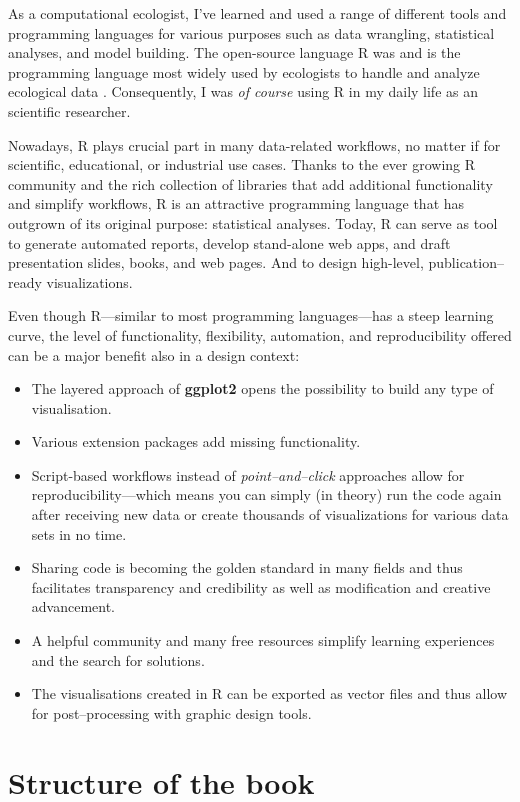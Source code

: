 \documentclass[
]{krantz}
\providecommand{\tightlist}{%
  \setlength{\itemsep}{0pt}\setlength{\parskip}{0pt}}
\begin{document}
As a computational ecologist, I've learned and used a range of different tools and programming languages for various purposes such as data wrangling, statistical analyses, and model building. The open-source language R was and is the programming language most widely used by ecologists to handle and analyze ecological data \citep{sciaini2018}. Consequently, I was \emph{of course} using R in my daily life as an scientific researcher.

Nowadays, R plays crucial part in many data-related workflows, no matter if for scientific, educational, or industrial use cases. Thanks to the ever growing R community and the rich collection of libraries that add additional functionality and simplify workflows, R is an attractive programming language that has outgrown of its original purpose: statistical analyses. Today, R can serve as tool to generate automated reports, develop stand-alone web apps, and draft presentation slides, books, and web pages. And to design high-level, publication--ready visualizations.

Even though R---similar to most programming languages---has a steep learning curve, the level of functionality, flexibility, automation, and reproducibility offered can be a major benefit also in a design context:

\begin{itemize}
\tightlist
\item
  The layered approach of \textbf{ggplot2} opens the possibility to build any type of visualisation.
\item
  Various extension packages add missing functionality.
\item
  Script-based workflows instead of \emph{point--and--click} approaches allow for reproducibility---which means you can simply (in theory) run the code again after receiving new data or create thousands of visualizations for various data sets in no time.
\item
  Sharing code is becoming the golden standard in many fields and thus facilitates transparency and credibility as well as modification and creative advancement.
\item
  A helpful community and many free resources simplify learning experiences and the search for solutions.
\item
  The visualisations created in R can be exported as vector files and thus allow for post--processing with graphic design tools.
\end{itemize}

\hypertarget{structure-of-the-book}{%
\section*{Structure of the book}\label{structure-of-the-book}}
\end{document}
